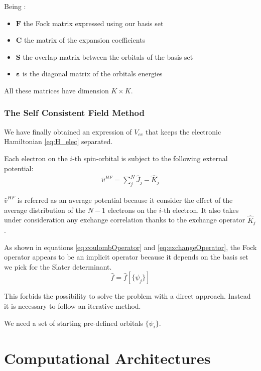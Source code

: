\documentclass[a4paper,12pt]{article}
\begin{document}
Being :
\begin{itemize}
	\item $\mathbf{F}$ the Fock matrix expressed using our basis set
	\item $\mathbf{C}$ the matrix of the expansion coefficients
	\item $\mathbf{S}$ the overlap matrix between the orbitals of the basis set
	\item $\mathbf{\varepsilon}$ is the diagonal matrix of the orbitals energies	
\end{itemize}
All these matrices have dimension $K\times K$.


\subsubsection{The Self Consistent Field Method}

We have finally obtained an expression of $V_{ee}$ that keeps the electronic Hamiltonian \eqref{eq:H_elec} separated.

Each electron on the $i$-th spin-orbital is subject to the following external potential:
\begin{align}
	\hat{v}^{HF} = \sum_{j}^{N} \hat{J}_{j} - \hat{K}_{j}
\end{align}

$\hat{v}^{HF}$ is referred as an average potential because it consider the effect of the average distribution of the $N-1$ electrons on the $i$-th electron. It also takes under consideration any exchange correlation thanks to the exchange operator $\hat{K}_j$.

As shown in equations \eqref{eq:coulombOperator} and \eqref{eq:exchangeOperator},
the Fock operator appears to be an implicit operator because it depends on the basis set we pick for the Slater determinant.
\begin{equation}
\hat{f} = \hat{f}[\{\psi_{j}\}]
\end{equation}


This forbids the possibility to solve the problem with a direct approach. Instead it is necessary to follow an iterative method.

We need a set of starting pre-defined orbitals $\{\psi_i\}$. 








\section{Computational Architectures} \label{comparch:sec}
\end{document}
